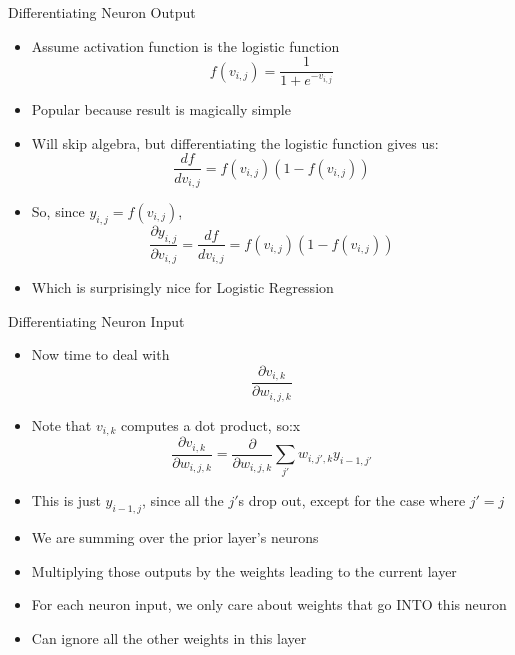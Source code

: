 \documentclass[aspectratio=169]{beamer}
\begin{document}
\begin{frame}{Differentiating Neuron Output}

\begin{itemize}
	\item Assume activation function is the logistic function
	$$f(v_{i,j}) = \frac{1}{1 + e^{-v_{i,j}}}$$
	\item Popular because result is magically simple
	\item Will skip algebra, but differentiating the logistic function gives us:
	$$\frac{df}{dv_{i,j}} = f(v_{i,j})(1 - f(v_{i,j}))$$
	\item So, since $y_{i,j} = f(v_{i,j})$,
	$$\frac{\partial y_{i,j}}{\partial v_{i,j}} = \frac{df}{dv_{i,j}} = 
		f(v_{i,j})(1 - f(v_{i,j}))$$
	\item Which is surprisingly nice for Logistic Regression
\end{itemize}

\end{frame}
\begin{frame}{Differentiating Neuron Input}

\begin{itemize} 
	\item Now time to deal with
	$$\frac{\partial v_{i,k}}{\partial w_{i,j,k}}$$
	\item Note that $v_{i,k}$ computes a dot product, so:x 
	$$\frac{\partial v_{i,k}}{\partial w_{i,j,k}} = \frac{\partial}{\partial w_{i,j,k}} 
		\sum_{j'} w_{i,j',k} y_{i-1,j'}$$
	\item This is just $y_{i-1,j}$, since all the $j'$s drop out, except for the case where $j'=j$
	\item We are summing over the prior layer's neurons
	\item Multiplying those outputs by the weights leading to the current layer
	\item For each neuron input, we only care about weights that go INTO this neuron
	\item Can ignore all the other weights in this layer
\end{itemize}
\end{frame}
\end{document}
